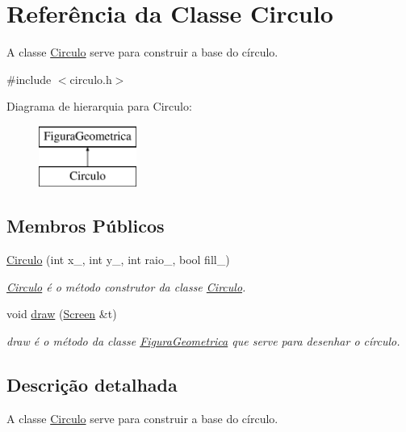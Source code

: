 \hypertarget{class_circulo}{}\section{Referência da Classe Circulo}
\label{class_circulo}


A classe \mbox{\hyperlink{class_circulo}{Circulo}} serve para construir a base do círculo.  




{\ttfamily \#include $<$circulo.\+h$>$}

Diagrama de hierarquia para Circulo\+:\begin{figure}[H]
\begin{center}
\leavevmode
\includegraphics[height=2.000000cm]{class_circulo}
\end{center}
\end{figure}
\subsection*{Membros Públicos}
\begin{DoxyCompactItemize}
\item 
\mbox{\hyperlink{class_circulo_adbd3016265651b29c514d52f2b31adef}{Circulo}} (int x\+\_\+, int y\+\_\+, int raio\+\_\+, bool fill\+\_\+)
\begin{DoxyCompactList}\small\item\em \mbox{\hyperlink{class_circulo}{Circulo}} é o método construtor da classe \mbox{\hyperlink{class_circulo}{Circulo}}. \end{DoxyCompactList}\item 
void \mbox{\hyperlink{class_circulo_a593787d6e0618c2eded23e8839e7bea6}{draw}} (\mbox{\hyperlink{class_screen}{Screen}} \&t)
\begin{DoxyCompactList}\small\item\em draw é o método da classe \mbox{\hyperlink{class_figura_geometrica}{Figura\+Geometrica}} que serve para desenhar o círculo. \end{DoxyCompactList}\end{DoxyCompactItemize}


\subsection{Descrição detalhada}
A classe \mbox{\hyperlink{class_circulo}{Circulo}} serve para construir a base do círculo. 

